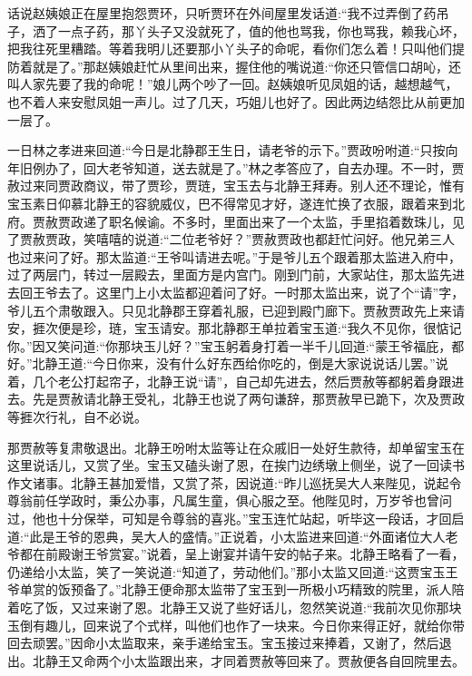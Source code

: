 


\begin{parag}
    话说赵姨娘正在屋里抱怨贾环，只听贾环在外间屋里发话道:“我不过弄倒了药吊子，洒了一点子药，那丫头子又没就死了，值的他也骂我，你也骂我，赖我心坏，把我往死里糟踏。等着我明儿还要那小丫头子的命呢，看你们怎么着！只叫他们提防着就是了。”那赵姨娘赶忙从里间出来，握住他的嘴说道:“你还只管信口胡吣，还叫人家先要了我的命呢！”娘儿两个吵了一回。赵姨娘听见凤姐的话，越想越气，也不着人来安慰凤姐一声儿。过了几天，巧姐儿也好了。因此两边结怨比从前更加一层了。
\end{parag}


\begin{parag}
    一日林之孝进来回道:“今日是北静郡王生日，请老爷的示下。”贾政吩咐道:“只按向年旧例办了，回大老爷知道，送去就是了。”林之孝答应了，自去办理。不一时，贾赦过来同贾政商议，带了贾珍，贾琏，宝玉去与北静王拜寿。别人还不理论，惟有宝玉素日仰慕北静王的容貌威仪，巴不得常见才好，遂连忙换了衣服，跟着来到北府。贾赦贾政递了职名候谕。不多时，里面出来了一个太监，手里掐着数珠儿，见了贾赦贾政，笑嘻嘻的说道:“二位老爷好？”贾赦贾政也都赶忙问好。他兄弟三人也过来问了好。那太监道:“王爷叫请进去呢。”于是爷儿五个跟着那太监进入府中，过了两层门，转过一层殿去，里面方是内宫门。刚到门前，大家站住，那太监先进去回王爷去了。这里门上小太监都迎着问了好。一时那太监出来，说了个“请”字，爷儿五个肃敬跟入。只见北静郡王穿着礼服，已迎到殿门廊下。贾赦贾政先上来请安，捱次便是珍，琏，宝玉请安。那北静郡王单拉着宝玉道:“我久不见你，很惦记你。”因又笑问道:“你那块玉儿好？”宝玉躬着身打着一半千儿回道:“蒙王爷福庇，都好。”北静王道:“今日你来，没有什么好东西给你吃的，倒是大家说说话儿罢。”说着，几个老公打起帘子，北静王说“请”，自己却先进去，然后贾赦等都躬着身跟进去。先是贾赦请北静王受礼，北静王也说了两句谦辞，那贾赦早已跪下，次及贾政等捱次行礼，自不必说。
\end{parag}


\begin{parag}
    那贾赦等复肃敬退出。北静王吩咐太监等让在众戚旧一处好生款待，却单留宝玉在这里说话儿，又赏了坐。宝玉又磕头谢了恩，在挨门边绣墩上侧坐，说了一回读书作文诸事。北静王甚加爱惜，又赏了茶，因说道:“昨儿巡抚吴大人来陛见，说起令尊翁前任学政时，秉公办事，凡属生童，俱心服之至。他陛见时，万岁爷也曾问过，他也十分保举，可知是令尊翁的喜兆。”宝玉连忙站起，听毕这一段话，才回启道:“此是王爷的恩典，吴大人的盛情。”正说着，小太监进来回道:“外面诸位大人老爷都在前殿谢王爷赏宴。”说着，呈上谢宴并请午安的帖子来。北静王略看了一看，仍递给小太监，笑了一笑说道:“知道了，劳动他们。”那小太监又回道:“这贾宝玉王爷单赏的饭预备了。”北静王便命那太监带了宝玉到一所极小巧精致的院里，派人陪着吃了饭，又过来谢了恩。北静王又说了些好话儿，忽然笑说道:“我前次见你那块玉倒有趣儿，回来说了个式样，叫他们也作了一块来。今日你来得正好，就给你带回去顽罢。”因命小太监取来，亲手递给宝玉。宝玉接过来捧着，又谢了，然后退出。北静王又命两个小太监跟出来，才同着贾赦等回来了。贾赦便各自回院里去。
\end{parag}


